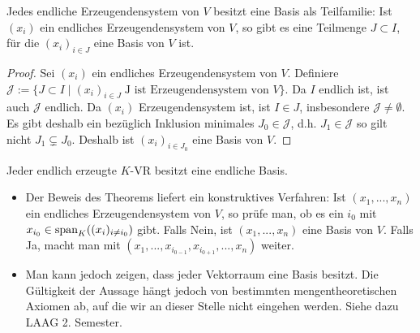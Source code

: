 \begin{theorem}[Basisauswahlsatz]
	Jedes endliche Erzeugendensystem von $V$ besitzt eine Basis  als 
	Teilfamilie: Ist $(x_i)$ ein endliches Erzeugendensystem von $V$, so gibt es eine Teilmenge $J\subset I$, 
	für die $(x_i)_{i\in J}$ eine Basis von $V$ ist. 
\end{theorem}
\begin{proof}
	Sei $(x_i)$ ein endliches Erzeugendensystem von $V$. Definiere $\mathcal J:=\{J \subset I \mid (x_i)_{i\in J}\; 
	\text{J ist Erzeugendensystem von }V\}$. Da $I$ endlich ist, ist auch $\mathcal J$ endlich. Da $(x_i)$ 
	Erzeugendensystem ist, ist $I\in J$, insbesondere $\mathcal J\neq\emptyset$. Es gibt deshalb ein bezüglich 
	Inklusion minimales $J_0\in \mathcal J$, d.h. $J_1 \in \mathcal J$ so gilt nicht $J_1 \subsetneq J_0$. Deshalb 
	ist $(x_i)_{i\in J_0}$ eine Basis von $V$.
\end{proof}

\begin{conclusion}
	Jeder endlich erzeugte $K$-VR besitzt eine endliche Basis.
\end{conclusion}

\begin{remark}
	\begin{itemize}
		\item Der Beweis des Theorems liefert ein konstruktives Verfahren: Ist $(x_1,...,x_n)$ ein endliches 
		Erzeugendensystem von $V$, so prüfe man, ob es ein $i_0$ mit $x_{i_0} \in \operatorname{span}_K((x_i)_{i\neq i_0})$ gibt. 
		Falls Nein, ist $(x_1,...,x_n)$ eine Basis von $V$. Falls Ja, macht man mit $(x_1,...,x_{i_{0-1}}, x_{i_{0+1}},
		...,x_n)$ weiter.
		\item Man kann jedoch zeigen, dass jeder Vektorraum eine Basis besitzt. Die Gültigkeit der Aussage hängt jedoch 
		von bestimmten mengentheoretischen Axiomen ab, auf die wir an dieser Stelle nicht eingehen werden. Siehe dazu 
		LAAG 2. Semester.
	\end{itemize}
\end{remark}

